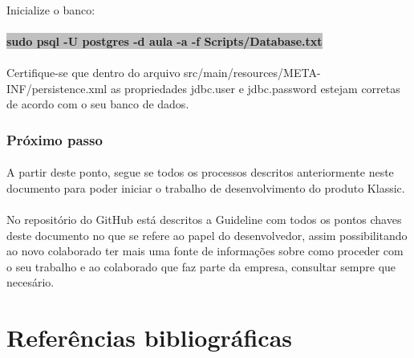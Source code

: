 \documentclass[	DIV=calc,%
							paper=a4,%
							fontsize=12pt,%
							onecolumn]{scrartcl}	 					%
\begin{document}
\paragraph{}
Inicialize o banco:
\paragraph{}
\textbf{\colorbox{Silver}{sudo psql -U postgres -d aula -a -f Scripts/Database.txt}}
\paragraph{}
Certifique-se que dentro do arquivo src/main/resources/META-INF/persistence.xml as
propriedades jdbc.user e jdbc.password estejam corretas de acordo com o seu banco de
dados.
\subsubsection{Próximo passo}
\paragraph{}
A partir deste ponto, segue se todos os processos descritos anteriormente neste documento para poder iniciar o trabalho de desenvolvimento do produto Klassic.
\paragraph{}
No repositório do GitHub está descritos a Guideline com todos os pontos chaves deste documento no que se refere ao papel do desenvolvedor, assim possibilitando ao novo colaborado ter mais uma fonte de informações sobre como proceder com o seu trabalho e ao colaborado que faz parte da empresa, consultar sempre que necesário.


\newpage
\section{Referências bibliográficas}
\renewcommand\refname{} %

 
\end{document}
